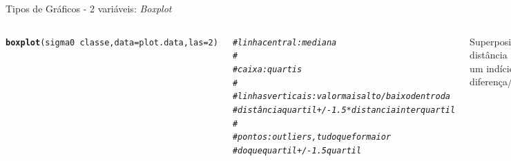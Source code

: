 \documentclass{beamer}\usepackage[]{graphicx}\usepackage[]{color}
\makeatletter
\newcommand{\hlnum}[1]{\textcolor[rgb]{0.686,0.059,0.569}{#1}}%
\newcommand{\hlcom}[1]{\textcolor[rgb]{0.678,0.584,0.686}{\textit{#1}}}%
\newcommand{\hlopt}[1]{\textcolor[rgb]{0,0,0}{#1}}%
\newcommand{\hlstd}[1]{\textcolor[rgb]{0.345,0.345,0.345}{#1}}%
\newcommand{\hlkwc}[1]{\textcolor[rgb]{0.333,0.667,0.333}{#1}}%
\newcommand{\hlkwd}[1]{\textcolor[rgb]{0.737,0.353,0.396}{\textbf{#1}}}%
\newenvironment{kframe}{%
 \def\at@end@of@kframe{}%
 \ifinner\ifhmode%
  \def\at@end@of@kframe{\end{minipage}}%
  \begin{minipage}{\columnwidth}%
 \fi\fi%
 \def\FrameCommand##1{\hskip\@totalleftmargin \hskip-\fboxsep
 \colorbox{shadecolor}{##1}\hskip-\fboxsep
     \hskip-\linewidth \hskip-\@totalleftmargin \hskip\columnwidth}%
 \MakeFramed {\advance\hsize-\width
   \@totalleftmargin\z@ \linewidth\hsize
   \@setminipage}}%
 {\par\unskip\endMakeFramed%
 \at@end@of@kframe}
\newenvironment{knitrout}{}{} %
\renewenvironment{knitrout}{\setlength{\topsep}{0mm}}{}
\makeatother
\begin{document}
\begin{frame}[fragile]{Tipos de Gráficos - 2 variáveis: \emph{Boxplot}}


\begin{columns}[t]


\begin{knitrout}\tiny
{}\color{fgcolor}\begin{kframe}
\begin{alltt}
\hlkwd{boxplot}\hlstd{(sigma0} \hlopt{~} \hlstd{classe,} \hlkwc{data}\hlstd{=plot.data,} \hlkwc{las}\hlstd{=}\hlnum{2}\hlstd{)}

\hlcom{#linha central: mediana}
\hlcom{#}
\hlcom{#caixa : quartis}
\hlcom{#}
\hlcom{#linhas verticais: valor mais alto/baixo dentro da }
\hlcom{# distância quartil+/-1.5*distancia interquartil}
\hlcom{#}
\hlcom{# pontos: outliers, tudo que for maior }
\hlcom{# do que quartil +/- 1.5 quartil}
\end{alltt}
\end{kframe}
\end{knitrout}

\scriptsize{Superposição da distância interquartil é um indício de diferença/separabilidade}


\begin{knitrout}
\color{fgcolor}
\includegraphics[width=1\linewidth]{figure/unnamed-chunk-73-1} 

\end{knitrout}

\end{columns}

\end{frame}
\end{document}
